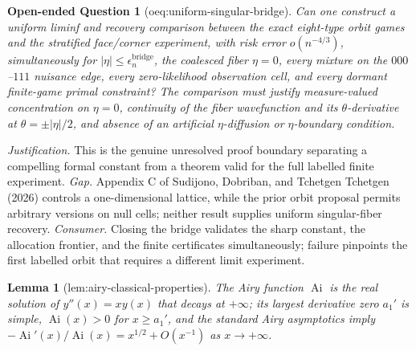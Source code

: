 \documentclass{article}
\newtheorem{lemma}{Lemma}
\newtheorem{openendedquestion}{Open-ended Question}
\begin{document}
\begin{openendedquestion}[oeq:uniform-singular-bridge]\label{oeq:uniform-singular-bridge}
Can one construct a uniform liminf and recovery comparison between the exact eight-type orbit games and the stratified face/corner experiment, with risk error \(o(n^{-4/3})\), simultaneously for \(|\eta|\le\epsilon_n^{\mathrm{bridge}}\), the coalesced fiber \(\eta=0\), every mixture on the \(000\)--\(111\) nuisance edge, every zero-likelihood observation cell, and every dormant finite-game primal constraint? The comparison must justify measure-valued concentration on \(\eta=0\), continuity of the fiber wavefunction and its \(\theta\)-derivative at \(\theta=\pm|\eta|/2\), and absence of an artificial \(\eta\)-diffusion or \(\eta\)-boundary condition.
\end{openendedquestion}
\par\smallskip\noindent \textit{Justification.} This is the genuine unresolved proof boundary separating a compelling formal constant from a theorem valid for the full labelled finite experiment. \textit{Gap.} Appendix C of Sudijono, Dobriban, and Tchetgen Tchetgen (2026) controls a one-dimensional lattice, while the prior orbit proposal permits arbitrary versions on null cells; neither result supplies uniform singular-fiber recovery. \textit{Consumer.} Closing the bridge validates the sharp constant, the allocation frontier, and the finite certificates simultaneously; failure pinpoints the first labelled orbit that requires a different limit experiment.

\begin{lemma}[lem:airy-classical-properties]\label{lem:airy-classical-properties}
The Airy function \(\operatorname{Ai}\) is the real solution of \(y''(x)=xy(x)\) that decays at \(+\infty\); its largest derivative zero \(a_1'\) is simple, \(\operatorname{Ai}(x)>0\) for \(x\geq a_1'\), and the standard Airy asymptotics imply \(-\operatorname{Ai}'(x)/\operatorname{Ai}(x)=x^{1/2}+O(x^{-1})\) as \(x\to+\infty\).
\end{lemma}
\end{document}
